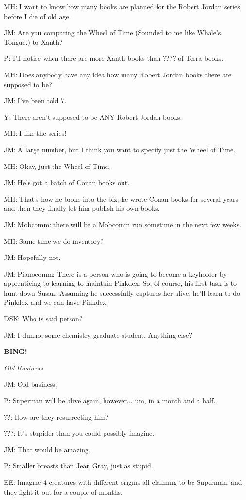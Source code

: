 \documentclass[12pt]{article}
\newcommand{\bing}{{\bf BING!} }
\newcommand{\goto}[1]{\bing \vskip 12pt \centerline{{\em{#1}}}}
\begin{document}
MH: I want to know how many books are planned for the Robert Jordan series before I die of old age.

JM: Are you comparing the Wheel of Time (Sounded to me like Whale's Tongue.) to Xanth?

P: I'll notice when there are more Xanth books than ???? of Terra books.

MH: Does anybody have any idea how many Robert Jordan books there are supposed to be?

JM: I've been told 7.

Y: There aren't supposed to be ANY Robert Jordan books.

MH: I like the series!

JM: A large number, but I think you want to specify just the Wheel of Time.

MH: Okay, just the Wheel of Time.

JM: He's got a batch of Conan books out.

MH: That's how he broke into the biz; he wrote Conan books for several years and then they finally let him publish his own books.

JM: Mobcomm: there will be a Mobcomm run sometime in the next few weeks.

MH: Same time we do inventory?

JM: Hopefully not.

JM: Pianocomm: There is a person who is going to become a keyholder by apprenticing to learning to maintain Pinkdex. So, of course, his first task is to hunt down Susan. Assuming he successfully captures her alive, he'll learn to do Pinkdex and we can have Pinkdex.

DSK: Who is said person?

JM: I dunno, some chemistry graduate student. Anything else?

\goto{Old Business}

JM: Old business.

P: Superman will be alive again, however... um, in a month and a half.

??: How are they resurrecting him?

???: It's stupider than you could possibly imagine.

JM: That would be amazing.

P: Smaller breasts than Jean Gray, just as stupid.

EE: Imagine 4 creatures with different origins all claiming to be Superman, and they fight it out for a couple of months.
\end{document}
